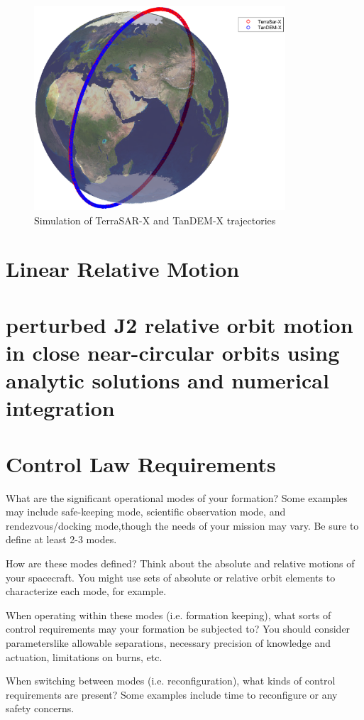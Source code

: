 \documentclass[11pt,letterpaper]{article}
\begin{document}
\begin{figure}[H]
	\centering
    \includegraphics[height=3in]{Figures/Traj2.eps}
    \caption{Simulation of TerraSAR-X and TanDEM-X trajectories}
    \label{figure:traj}
\end{figure}

\section{Linear Relative Motion}
\section{perturbed J2 relative orbit motion in close near-circular  orbits  using  analytic  solutions  and  numerical  integration}
\section{Control Law Requirements}
What are the significant operational modes of your formation?  Some examples may include safe-keeping mode, scientific observation mode, and rendezvous/docking mode,though the needs of your mission may vary.  Be sure to define at least 2-3 modes.

How are these modes defined?  Think about the absolute and relative motions of your spacecraft.  You might use sets of absolute or relative orbit elements to characterize each mode, for example.

When  operating  within  these  modes  (i.e.   formation  keeping),  what  sorts  of  control requirements may your formation be subjected to?  You should consider parameterslike allowable separations, necessary precision of knowledge and actuation, limitations on burns, etc.

When switching between modes (i.e.  reconfiguration), what kinds of control requirements are present?  Some examples include time to reconfigure or any safety concerns.
\end{document}
